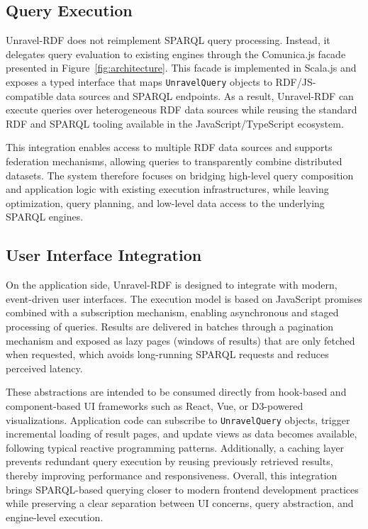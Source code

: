 \documentclass[
]{ceurart}
\begin{document}
\subsection{Query Execution}

Unravel-RDF does not reimplement SPARQL query processing. Instead, it
delegates query evaluation to existing engines through the
Comunica.js facade presented in Figure~\ref{fig:architecture}. This
facade is implemented in Scala.js and exposes a typed interface that
maps \texttt{UnravelQuery} objects to RDF/JS-compatible data sources and
SPARQL endpoints. As a result, Unravel-RDF can execute queries over
heterogeneous RDF data sources while reusing the standard RDF and
SPARQL tooling available in the JavaScript/TypeScript ecosystem.

This integration enables access to multiple RDF data sources and
supports federation mechanisms, allowing queries to transparently
combine distributed datasets. The system therefore focuses on bridging
high-level query composition and application logic with existing
execution infrastructures, while leaving optimization, query planning,
and low-level data access to the underlying SPARQL engines.

\subsection{User Interface Integration}

On the application side, Unravel-RDF is designed to integrate with
modern, event-driven user interfaces. The execution model is based on
JavaScript promises combined with a subscription mechanism, enabling
asynchronous and staged processing of queries. Results are delivered in
batches through a pagination mechanism and exposed as lazy pages
(windows of results) that are only fetched when requested, which avoids
long-running SPARQL requests and reduces perceived latency.

These abstractions are intended to be consumed directly from
hook-based and component-based UI frameworks such as React, Vue, or
D3-powered visualizations. Application code can subscribe to
\texttt{UnravelQuery} objects, trigger incremental loading of result
pages, and update views as data becomes available, following typical
reactive programming patterns. Additionally, a caching layer prevents
redundant query execution by reusing previously retrieved results,
thereby improving performance and responsiveness. Overall, this
integration brings SPARQL-based querying closer to modern frontend
development practices while preserving a clear separation between UI
concerns, query abstraction, and engine-level execution.
\end{document}
